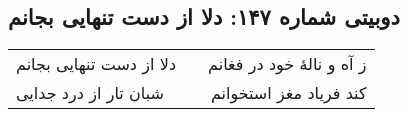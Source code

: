 \begin{center}
\section*{دوبیتی شماره ۱۴۷: دلا از دست تنهایی بجانم}
\label{sec:147}
\begin{longtable}{l p{0.5cm} r}
دلا از دست تنهایی بجانم
&&
ز آه و نالهٔ خود در فغانم
\\
شبان تار از درد جدایی
&&
کند فریاد مغز استخوانم
\\
\end{longtable}
\end{center}
